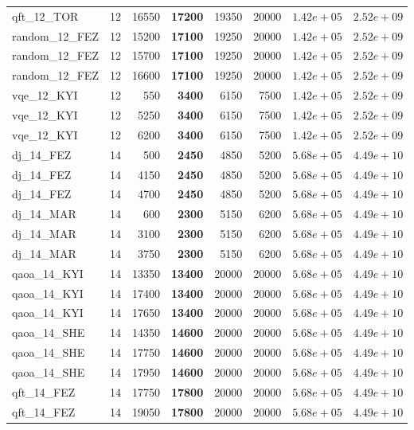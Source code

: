 \begin{table}[ht!]
\begin{tabular}{l c r r r r r r}
qft\_12\_TOR & 12 & 16550 & \textbf{17200} & 19350 & 20000 & $1.42e+05$ & $2.52e+09$ \\
random\_12\_FEZ & 12 & 15200 & \textbf{17100} & 19250 & 20000 & $1.42e+05$ & $2.52e+09$ \\
random\_12\_FEZ & 12 & 15700 & \textbf{17100} & 19250 & 20000 & $1.42e+05$ & $2.52e+09$ \\
random\_12\_FEZ & 12 & 16600 & \textbf{17100} & 19250 & 20000 & $1.42e+05$ & $2.52e+09$ \\
vqe\_12\_KYI & 12 & 550 & \textbf{3400} & 6150 & 7500 & $1.42e+05$ & $2.52e+09$ \\
vqe\_12\_KYI & 12 & 5250 & \textbf{3400} & 6150 & 7500 & $1.42e+05$ & $2.52e+09$ \\
vqe\_12\_KYI & 12 & 6200 & \textbf{3400} & 6150 & 7500 & $1.42e+05$ & $2.52e+09$ \\
dj\_14\_FEZ & 14 & 500 & \textbf{2450} & 4850 & 5200 & $5.68e+05$ & $4.49e+10$ \\
dj\_14\_FEZ & 14 & 4150 & \textbf{2450} & 4850 & 5200 & $5.68e+05$ & $4.49e+10$ \\
dj\_14\_FEZ & 14 & 4700 & \textbf{2450} & 4850 & 5200 & $5.68e+05$ & $4.49e+10$ \\
dj\_14\_MAR & 14 & 600 & \textbf{2300} & 5150 & 6200 & $5.68e+05$ & $4.49e+10$ \\
dj\_14\_MAR & 14 & 3100 & \textbf{2300} & 5150 & 6200 & $5.68e+05$ & $4.49e+10$ \\
dj\_14\_MAR & 14 & 3750 & \textbf{2300} & 5150 & 6200 & $5.68e+05$ & $4.49e+10$ \\
qaoa\_14\_KYI & 14 & 13350 & \textbf{13400} & 20000 & 20000 & $5.68e+05$ & $4.49e+10$ \\
qaoa\_14\_KYI & 14 & 17400 & \textbf{13400} & 20000 & 20000 & $5.68e+05$ & $4.49e+10$ \\
qaoa\_14\_KYI & 14 & 17650 & \textbf{13400} & 20000 & 20000 & $5.68e+05$ & $4.49e+10$ \\
qaoa\_14\_SHE & 14 & 14350 & \textbf{14600} & 20000 & 20000 & $5.68e+05$ & $4.49e+10$ \\
qaoa\_14\_SHE & 14 & 17750 & \textbf{14600} & 20000 & 20000 & $5.68e+05$ & $4.49e+10$ \\
qaoa\_14\_SHE & 14 & 17950 & \textbf{14600} & 20000 & 20000 & $5.68e+05$ & $4.49e+10$ \\
qft\_14\_FEZ & 14 & 17750 & \textbf{17800} & 20000 & 20000 & $5.68e+05$ & $4.49e+10$ \\
qft\_14\_FEZ & 14 & 19050 & \textbf{17800} & 20000 & 20000 & $5.68e+05$ & $4.49e+10$ \\

\end{tabular}
\end{table}
